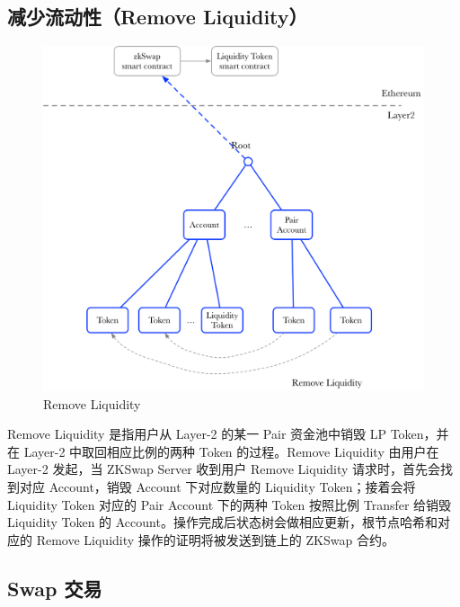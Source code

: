 \documentclass[]{template/llncs}
\begin{document}
\pagebreak


\subsection{减少流动性（Remove Liquidity）}

\begin{figure}[htbp]
\centering
\includegraphics[width=0.9\columnwidth]{figure/remove_liquidity}
\caption{Remove Liquidity}
\label{fig:remove_liquidity}
\end{figure}

Remove Liquidity 是指用户从 Layer-2 的某一 Pair 资金池中销毁 LP Token，并在 Layer-2 中取回相应比例的两种 Token 的过程。Remove Liquidity 由用户在 Layer-2 发起，当 ZKSwap Server 收到用户 Remove Liquidity 请求时，首先会找到对应 Account，销毁 Account 下对应数量的 Liquidity Token；接着会将 Liquidity Token 对应的 Pair Account 下的两种 Token 按照比例 Transfer 给销毁 Liquidity Token 的 Account。操作完成后状态树会做相应更新，根节点哈希和对应的 Remove Liquidity 操作的证明将被发送到链上的 ZKSwap 合约。

\pagebreak


\subsection{Swap 交易}
\end{document}

